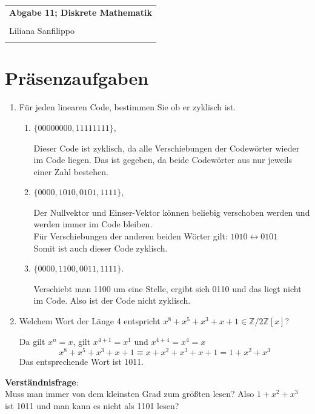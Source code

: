 \documentclass{article} %
\newcommand{\titulo}{Abgabe 11; Diskrete Mathematik}
\newcommand{\nombre}{Liliana Sanfilippo}
\begin{document}
\begin{tabular}{p{12cm}}
{{\Large\bf\titulo}}\\
\vspace{0.2cm}\\
 {\large\nombre}\\
 \vspace{0.1cm}
\end{tabular}

\section*{Präsenzaufgaben}
\begin{enumerate}
    \item Für jeden linearen Code, bestimmen Sie ob er zyklisch ist. 
    \begin{enumerate}
        \item $\{00000000, 11111111\}$,
        \begin{mybox}
        Dieser Code ist zyklisch, da alle Verschiebungen der Codewörter wieder im Code liegen. Das ist gegeben, da beide Codewörter aus nur jeweils einer Zahl bestehen. 
        \end{mybox}
        \item $\{0000, 1010, 0101, 1111\}$,
        \begin{mybox}
        Der Nullvektor und Einser-Vektor können beliebig verschoben werden und werden immer im Code bleiben. \\
        Für Verschiebungen der anderen beiden Wörter gilt: $1010 \leftrightarrow 0101$ \\
        Somit ist auch dieser Code zyklisch. 
        \end{mybox}
        \item $\{0000, 1100, 0011, 1111\}$.
         \begin{mybox}
        Verschiebt man 1100 um eine Stelle, ergibt sich 0110 und das liegt nicht im Code. Also ist der Code nicht zyklisch. 
        \end{mybox}
    \end{enumerate}
    \item Welchem Wort der Länge 4 entspricht $x^8 + x^5 + x^3 + x + 1 \in \mathbb{Z}/2\mathbb{Z}[x]$?
    \begin{mybox}
    Da gilt $x^{n} = x$, gilt $x^{4+1} = x^1$ und $x^{4+4} = x^4 = x$
    \[
    x^8 + x^5 + x^3 + x + 1 \equiv x + x^2 + x^3 + x + 1 = 1 + x^2 + x^3
    \]
    Das entsprechende Wort ist 1011.
    \end{mybox}
\end{enumerate}
\begin{mybox}
\textbf{Verständnisfrage}: \\
Muss man immer von dem kleinsten Grad zum größten lesen? 
Also $1 + x^2 + x^3$ ist 1011 und man kann es nicht als 1101 lesen?
\end{mybox}
\end{document}
